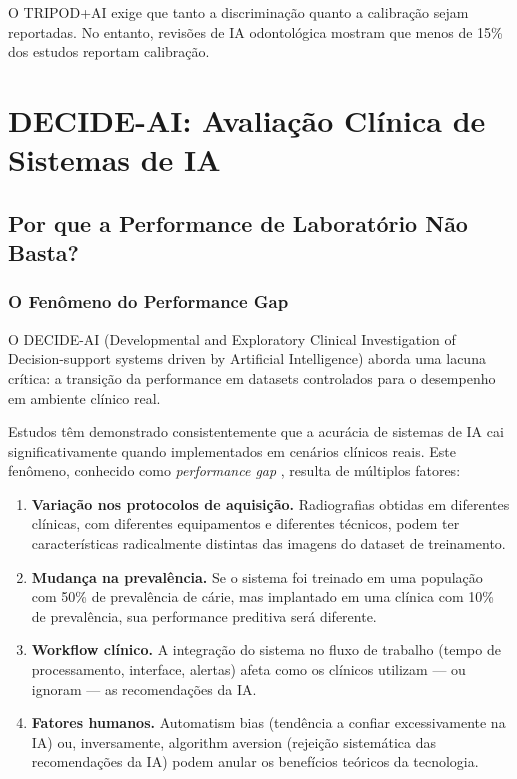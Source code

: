 O TRIPOD+AI exige que tanto a discriminação quanto a calibração sejam reportadas. No entanto, revisões de IA odontológica mostram que menos de 15\% dos estudos reportam calibração.

\section{DECIDE-AI: Avaliação Clínica de Sistemas de IA}

\subsection{Por que a Performance de Laboratório Não Basta?}

\subsubsection{O Fenômeno do Performance Gap}

O DECIDE-AI  (Developmental and Exploratory Clinical Investigation of Decision-support systems driven by Artificial Intelligence) aborda uma lacuna crítica: a transição da performance em datasets controlados para o desempenho em ambiente clínico real.

Estudos têm demonstrado consistentemente que a acurácia de sistemas de IA cai significativamente quando implementados em cenários clínicos reais. Este fenômeno, conhecido como \textit{performance gap} , resulta de múltiplos fatores:

\begin{enumerate}
    \item \textbf{Variação nos protocolos de aquisição.} Radiografias obtidas em diferentes clínicas, com diferentes equipamentos e diferentes técnicos, podem ter características radicalmente distintas das imagens do dataset de treinamento.
    \item \textbf{Mudança na prevalência.} Se o sistema foi treinado em uma população com 50\% de prevalência de cárie, mas implantado em uma clínica com 10\% de prevalência, sua performance preditiva será diferente.
    \item \textbf{Workflow clínico.} A integração do sistema no fluxo de trabalho (tempo de processamento, interface, alertas) afeta como os clínicos utilizam — ou ignoram — as recomendações da IA.
    \item \textbf{Fatores humanos.} Automatism bias (tendência a confiar excessivamente na IA) ou, inversamente, algorithm aversion (rejeição sistemática das recomendações da IA) podem anular os benefícios teóricos da tecnologia.
\end{enumerate}

